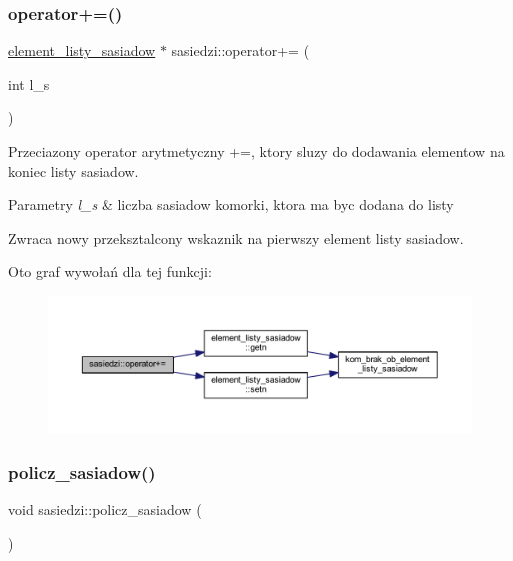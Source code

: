 \subsubsection{\texorpdfstring{operator+=()}{operator+=()}}
{\footnotesize\ttfamily \mbox{\hyperlink{classelement__listy__sasiadow}{element\+\_\+listy\+\_\+sasiadow}} $\ast$ sasiedzi\+::operator+= (\begin{DoxyParamCaption}\item[{int}]{l\+\_\+s }\end{DoxyParamCaption})}

Przeciazony operator arytmetyczny +=, ktory sluzy do dodawania elementow na koniec listy sasiadow. 
\begin{DoxyParams}{Parametry}
{\em l\+\_\+s} & liczba sasiadow komorki, ktora ma byc dodana do listy \\
\hline
\end{DoxyParams}
\begin{DoxyReturn}{Zwraca}
nowy przeksztalcony wskaznik na pierwszy element listy sasiadow. 
\end{DoxyReturn}
Oto graf wywołań dla tej funkcji\+:
\nopagebreak
\begin{figure}[H]
\begin{center}
\leavevmode
\includegraphics[width=350pt]{classsasiedzi_a17ed824bb9a4791c2c4f3e88719b0005_cgraph}
\end{center}
\end{figure}
\mbox{\label{classsasiedzi_afe22b3109116d244e1601923e52e7ddf}} 
\subsubsection{\texorpdfstring{policz\+\_\+sasiadow()}{policz\_sasiadow()}}
{\footnotesize\ttfamily void sasiedzi\+::policz\+\_\+sasiadow (\begin{DoxyParamCaption}{ }\end{DoxyParamCaption})}

